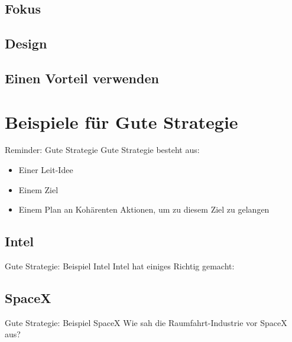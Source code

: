\documentclass[12pt,compress,ngerman,utf8,t]{beamer}
\begin{document}
\subsection{Fokus}
\subsection{Design}
\subsection{Einen Vorteil verwenden}



\section{Beispiele für Gute Strategie}

\begin{frame}{Reminder: Gute Strategie}
    Gute Strategie besteht aus:
    \begin{itemize}
        \item Einer Leit-Idee
        \item Einem Ziel
        \item Einem Plan an Kohärenten Aktionen, um zu diesem Ziel zu gelangen
    \end{itemize}
\end{frame}

\subsection{Intel}

\begin{frame}[c]{Gute Strategie: Beispiel Intel}
    Intel hat einiges Richtig gemacht:
\end{frame}

\subsection{SpaceX}

\begin{frame}[c]{Gute Strategie: Beispiel SpaceX}
    Wie sah die Raumfahrt-Industrie vor SpaceX aus?
\end{frame}
\end{document}
